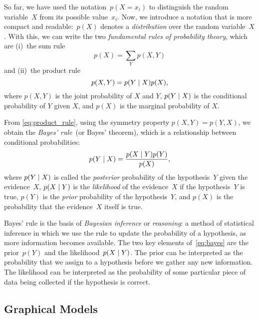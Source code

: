 So far, we have used the notation~$p(X = x_i)$ to distinguish the random variable~$X$ from its possible value~$x_i$.
Now, we introduce a notation that is more compact and readable:~$p(X)$ denotes a \emph{distribution} over the random variable~$X$.
With this, we can write the two \emph{fundamental rules of probability theory}, which are (i)~the sum rule
\begin{equation} \label{eq:sum_rule}
    p(X) = \sum_Y p(X,Y)
\end{equation}
and (ii)~the product rule
\begin{equation} \label{eq:product_rule}
    p(X,Y) = p(Y \mid X) p(X),
\end{equation}
where $p(X,Y)$ is the joint probability of $X$ and $Y$, $p(Y \mid X)$ is the conditional probability of $Y$ given $X$, and $p(X)$ is the marginal probability of $X$.

From \eqref{eq:product_rule}, using the symmetry property $p(X,Y) = p(Y,X)$, we obtain the \emph{Bayes' rule}~(or Bayes' theorem), which is a relationship between conditional probabilities:
\begin{equation} \label{eq:bayes}
    p(Y \mid X) = \frac{p(X \mid Y) p(Y)}{p(X)},
\end{equation}
where $p(Y \mid X)$ is called the \emph{posterior} probability of the hypothesis~$Y$ given the evidence~$X$,
$p(X \mid Y)$ is the \emph{likelihood} of the evidence~$X$ if the hypothesis~$Y$ is true,
$p(Y)$ is the \emph{prior} probability of the hypothesis~$Y$, and
$p(X)$ is the probability that the evidence~$X$ itself is true.

Bayes' rule is the basis of \emph{Bayesian inference} or \emph{reasoning}: a method of statistical inference in which we use the rule to update the probability of a hypothesis, as more information becomes available.
The two key elements of~\eqref{eq:bayes} are the prior~$p(Y)$ and the likelihood~$p(X \mid Y)$.
The prior can be interpreted as the probability that we assign to a hypothesis before we gather any new information.
The likelihood can be interpreted as the probability of some particular piece of data being collected if the hypothesis is correct.

\subsection{Graphical Models}
\label{sec:background:theory:graphical_models}

